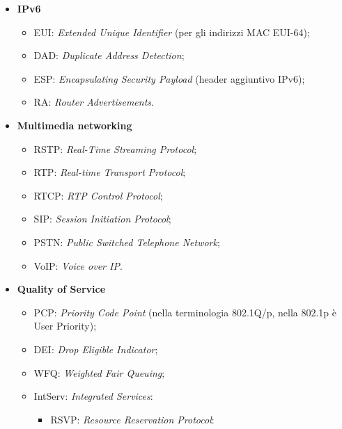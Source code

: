 \begin{itemize}
\begin{itemize}
\begin{itemize}
\end{itemize}

\end{itemize}

\item{\textbf{IPv6}}

\begin{itemize}

\item{EUI}: \emph{Extended Unique Identifier} (per gli indirizzi MAC EUI-64);
\item{DAD}: \emph{Duplicate Address Detection};
\item{ESP}: \emph{Encapsulating Security Payload} (header aggiuntivo IPv6);
\item{RA}: \emph{Router Advertisements}.

\end{itemize}

\item{\textbf{Multimedia networking}}

\begin{itemize}

\item{RSTP}: \emph{Real-Time Streaming Protocol};
\item{RTP}: \emph{Real-time Transport Protocol};
\item{RTCP}: \emph{RTP Control Protocol};
\item{SIP}: \emph{Session Initiation Protocol};
\item{PSTN}: \emph{Public Switched Telephone Network};
\item{VoIP}: \emph{Voice over IP}.

\end{itemize}

\item{\textbf{Quality of Service}}

\begin{itemize}

\item{PCP}: \emph{Priority Code Point} (nella terminologia 802.1Q/p, nella 802.1p è User Priority);
\item{DEI}: \emph{Drop Eligible Indicator};
\item{WFQ}: \emph{Weighted Fair Queuing};
\item{IntServ}: \emph{Integrated Services}:

\begin{itemize}

\item{RSVP}: \emph{Resource Reservation Protocol}:


\end{itemize}
\end{itemize}
\end{itemize}
